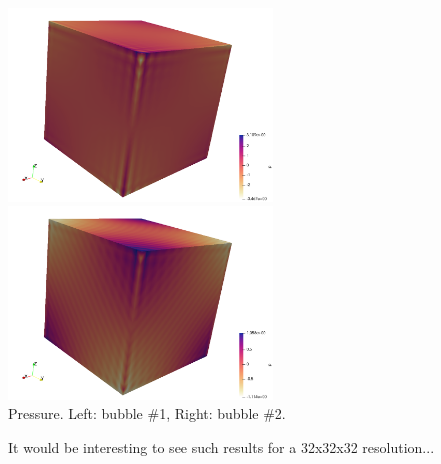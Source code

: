 \begin{center}
\includegraphics[width=7cm]{python_codes/fieldstone_75/results/mms3D/p_b1}
\includegraphics[width=7cm]{python_codes/fieldstone_75/results/mms3D/p_b2}\\
{\captionfont Pressure. Left: bubble \#1, Right: bubble \#2.}
\end{center}

It would be interesting to see such results for a 32x32x32 resolution... 

